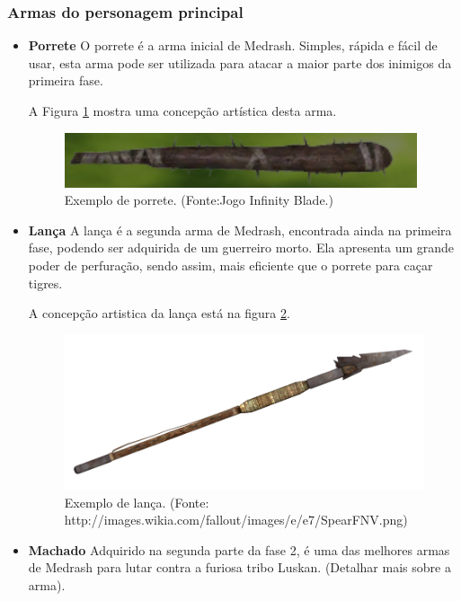 \subsubsection{Armas do personagem principal}
\begin{itemize}
\item {\bf Porrete}
O porrete é a arma inicial de Medrash. Simples, rápida e fácil de usar,
 esta arma pode ser utilizada para atacar a maior parte dos inimigos da
 primeira fase.

A Figura \ref{img:porrete} mostra uma concepção artística desta arma.

\begin{figure}[!ht]
 \centering
 \includegraphics[scale=1]{Imagens/porrete01.png}
 \caption{Exemplo de porrete. (Fonte:Jogo Infinity Blade.)}
\label{img:porrete}
\end{figure}

\item {\bf Lança}
A lança é a segunda arma de Medrash, encontrada ainda na primeira fase,
 podendo ser adquirida de um guerreiro morto. Ela apresenta um grande poder
 de perfuração, sendo assim, mais eficiente que o porrete para caçar
 tigres.

A concepção artistica da lança está na figura \ref{img:lanca}.

\begin{figure}[!ht]
 \centering
 \includegraphics[scale=0.6]{Imagens/lanca01.png}
 \caption{Exemplo de lança. (Fonte: http://images.wikia.com/fallout/images/e/e7/SpearFNV.png)}
\label{img:lanca}
\end{figure}


\item {\bf Machado}
Adquirido na segunda parte da fase 2, é uma das melhores armas de Medrash
 para lutar contra a furiosa tribo Luskan. (Detalhar mais sobre a arma).


\end{itemize}
